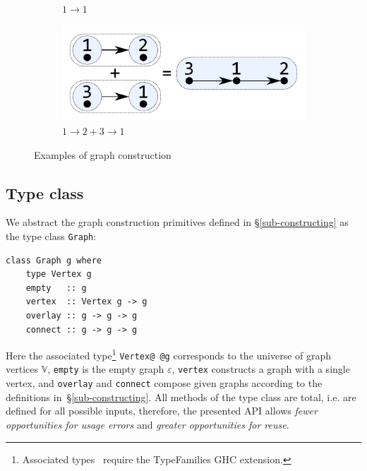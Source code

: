 \documentclass[acmlarge,anonymous]{acmart}\settopmatter{printfolios=true}
\newcommand{\hs}{\texttt}
\begin{document}
\begin{figure}
\begin{subfigure}[b]{0.15\linewidth}
\vspace{2.4mm}
\caption{$1 \rightarrow 1$}
\end{subfigure}
\hspace{12mm}
\begin{subfigure}[b]{0.2\linewidth}
\centerline{\includegraphics[scale=0.27]{fig/ex-e.pdf}}
\vspace{-1mm}
\caption{$1 \rightarrow 2 + 3 \rightarrow 1$}
\end{subfigure}
\vspace{-1mm}
\caption{Examples of graph construction\label{fig-construction}}
\vspace{-3mm}
\end{figure}

\vspace{-1mm}
\subsection{Type class}\label{sub-class}

We abstract the graph construction primitives defined in \S\ref{sub-constructing}
as the type class \hs{Graph}:

\begin{verbatim}
class Graph g where
    type Vertex g
    empty   :: g
    vertex  :: Vertex g -> g
    overlay :: g -> g -> g
    connect :: g -> g -> g
\end{verbatim}

\noindent
Here the associated type\footnote{Associated
types~\cite{2005_associated_type_chakravarty} require the \textsf{TypeFamilies}
GHC extension.} \hs{Vertex@\,@g} corresponds to the universe of graph
vertices $\mathbb{V}$, \hs{empty} is the empty graph
$\varepsilon$, \hs{vertex} constructs a graph with a single vertex,
and \hs{overlay} and \hs{connect} compose given graphs according to
the definitions in~\S\ref{sub-constructing}. All methods of the type class
are total, i.e. are defined for all possible inputs, therefore,
the presented API allows \emph{fewer opportunities for usage errors}
and \emph{greater opportunities for reuse}.
\end{document}
